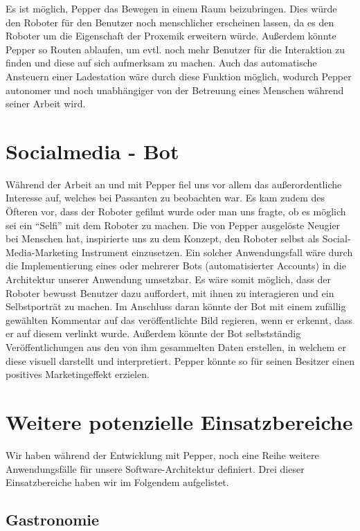Es ist möglich, Pepper das Bewegen in einem Raum beizubringen. Dies würde den Roboter für den Benutzer noch menschlicher erscheinen lassen, da es den Roboter um die Eigenschaft der Proxemik erweitern würde. Außerdem könnte Pepper so Routen ablaufen, um evtl. noch mehr Benutzer für die Interaktion zu finden und diese auf sich aufmerksam zu machen. Auch das automatische Ansteuern einer Ladestation wäre durch diese Funktion möglich, wodurch Pepper autonomer und noch unabhängiger von der Betreuung eines Menschen während seiner Arbeit wird.\\

\section{Socialmedia - Bot}
\label{sec:Sozialmedia-Bot}
Während der Arbeit an und mit Pepper fiel uns vor allem das außerordentliche Interesse auf, welches bei Passanten zu beobachten war. Es kam zudem des Öfteren vor, dass der Roboter gefilmt wurde oder man uns fragte, ob es möglich sei ein “Selfi” mit dem Roboter zu machen. Die von Pepper ausgelöste Neugier bei Menschen hat, inspirierte uns zu dem Konzept, den Roboter selbst als Social-Media-Marketing Instrument einzusetzen.
Ein solcher Anwendungsfall wäre durch die Implementierung eines oder mehrerer Bots (automatisierter Accounts) in die Architektur unserer Anwendung umsetzbar. Es wäre somit möglich, dass der Roboter bewusst Benutzer dazu auffordert, mit ihnen zu interagieren und ein Selbstporträt zu machen. Im Anschluss daran könnte der Bot mit einem zufällig gewählten Kommentar auf das veröffentlichte Bild regieren, wenn er erkennt, dass er auf diesem verlinkt wurde. Außerdem könnte der Bot selbstständig Veröffentlichungen aus den von ihm gesammelten Daten erstellen, in welchem er diese visuell darstellt und interpretiert. Pepper könnte so für seinen Besitzer einen positives Marketingeffekt erzielen.\\

\section{Weitere potenzielle Einsatzbereiche}

Wir haben während der Entwicklung mit Pepper, noch eine Reihe weitere Anwendungsfälle für unsere Software-Architektur definiert. Drei dieser Einsatzbereiche haben wir im Folgendem aufgelistet.\\

\subsection{Gastronomie}

